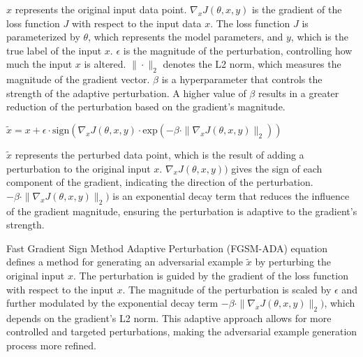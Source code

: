 
$x$ represents the original input data point.
$\nabla_x J(\theta, x, y)$ is the gradient of the loss function $J$ with respect to the input data $x$. The loss function $J$ is parameterized by $\theta$, which represents the model parameters, and $y$, which is the true label of the input $x$.
$\epsilon$ is the magnitude of the perturbation, controlling how much the input $x$ is altered.
$\| \cdot \|_2$ denotes the L2 norm, which measures the magnitude of the gradient vector.
$\beta$ is a hyperparameter that controls the strength of the adaptive perturbation. A higher value of $\beta$ results in a greater reduction of the perturbation based on the gradient's magnitude.

$\tilde{x} = x + \epsilon \cdot \text{sign}(\nabla_x J(\theta, x, y) \cdot \text{exp}(-\beta \cdot \| \nabla_x J(\theta, x, y) \|_2))$

$\tilde{x}$ represents the perturbed data point, which is the result of adding a perturbation to the original input $x$.
$\nabla_x J(\theta, x, y))$ gives the sign of each component of the gradient, indicating the direction of the perturbation.
$-\beta \cdot \| \nabla_x J(\theta, x, y) \|_2)$ is an exponential decay term that reduces the influence of the gradient magnitude, ensuring the perturbation is adaptive to the gradient's strength.


Fast Gradient Sign Method Adaptive Perturbation (FGSM-ADA) equation defines a method for generating an adversarial example $\tilde{x}$ by perturbing the original input $x$. The perturbation is guided by the gradient of the loss function with respect to the input $x$. The magnitude of the perturbation is scaled by $\epsilon$ and further modulated by the exponential decay term $-\beta \cdot \| \nabla_x J(\theta, x, y) \|_2)$, which depends on the gradient's L2 norm. This adaptive approach allows for more controlled and targeted perturbations, making the adversarial example generation process more refined.
